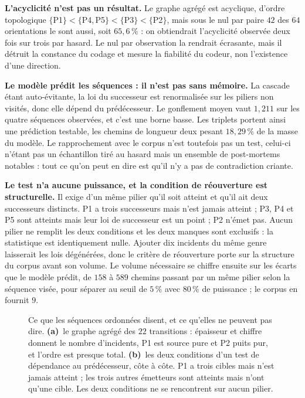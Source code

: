 \textbf{L'acyclicité n'est pas un résultat.} Le graphe agrégé est acyclique, d'ordre topologique
$\{$P1$\} < \{$P4,\,P5$\} < \{$P3$\} < \{$P2$\}$, mais sous le nul par paire $42$ des $64$
orientations le sont aussi, soit $65{,}6\,\%$ : on obtiendrait l'acyclicité observée deux fois sur
trois par hasard. Le nul par observation la rendrait écrasante, mais il détruit la constance du
codage et mesure la fiabilité du codeur, non l'existence d'une direction.

\textbf{Le modèle prédit les séquences : il n'est pas sans mémoire.} La cascade étant
auto-évitante, la loi du successeur est renormalisée sur les piliers non visités, donc elle dépend
du prédécesseur. Le gonflement moyen vaut $1{,}211$ sur les quatre séquences observées, et c'est
une borne basse. Les triplets portent ainsi une prédiction testable, les chemins de longueur deux
pesant $18{,}29\,\%$ de la masse du modèle. Le rapprochement avec le corpus n'est toutefois pas un
test, celui-ci n'étant pas un échantillon tiré au hasard mais un ensemble de post-mortems
notables : tout ce qu'on peut en dire est qu'il n'y a pas de contradiction criante.

\textbf{Le test n'a aucune puissance, et la condition de réouverture est structurelle.} Il exige
d'un même pilier qu'il soit atteint et qu'il ait deux successeurs distincts. P1 a trois successeurs
mais n'est jamais atteint ; P3, P4 et P5 sont atteints mais leur loi de successeur est un point ;
P2 n'émet pas. Aucun pilier ne remplit les deux conditions et les deux manques sont exclusifs :
la statistique est identiquement nulle. Ajouter dix incidents du même genre laisserait les lois
dégénérées, donc le critère de réouverture porte sur la structure du corpus avant son volume. Le
volume nécessaire se chiffre ensuite sur les écarts que le modèle prédit, de $158$ à $589$ chemins
passant par un même pilier selon la séquence visée, pour séparer au seuil de $5\,\%$ avec $80\,\%$
de puissance ; le corpus en fournit $9$.

\begin{figure}[htbp]\centering
{}
\caption{Ce que les séquences ordonnées disent, et ce qu'elles ne peuvent pas dire.
\textbf{(a)}~le graphe agrégé des $22$ transitions : épaisseur et chiffre donnent le nombre
d'incidents, P1 est source pure et P2 puits pur, et l'ordre est presque total.
\textbf{(b)}~les deux conditions d'un test de dépendance au prédécesseur, côte à côte. P1 a trois
cibles mais n'est jamais atteint ; les trois autres émetteurs sont atteints mais n'ont qu'une
cible. Les deux conditions ne se rencontrent sur aucun pilier.}
\label{fig:sequences-ordonnees}
\end{figure}

